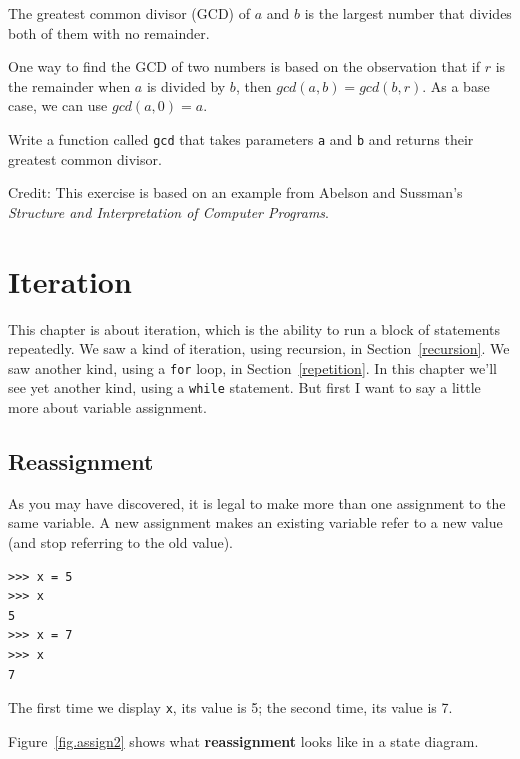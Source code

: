 \documentclass[10pt]{book}
\begin{document}
\begin{exercise}

The greatest common divisor (GCD) of $a$ and $b$ is the largest number
that divides both of them with no remainder.

One way to find the GCD of two numbers is based on the observation
that if $r$ is the remainder when $a$ is divided by $b$, then $gcd(a,
b) = gcd(b, r)$.  As a base case, we can use $gcd(a, 0) = a$.

Write a function called
\verb"gcd" that takes parameters {\tt a} and {\tt b}
and returns their greatest common divisor.

Credit: This exercise is based on an example from Abelson and
Sussman's {\em Structure and Interpretation of Computer Programs}.

\end{exercise}


\chapter{Iteration}

This chapter is about iteration, which is the ability to run
a block of statements repeatedly.  We saw a kind of iteration,
using recursion, in Section~\ref{recursion}.
We saw another kind, using a {\tt for} loop,
in Section~\ref{repetition}.  In this chapter we'll see yet another
kind, using a {\tt while} statement.
But first I want to say a little more about variable assignment.


\section{Reassignment}

As you may have discovered, it is legal to make more than one
assignment to the same variable.  A new assignment makes an existing
variable refer to a new value (and stop referring to the old value).

\begin{verbatim}
>>> x = 5
>>> x
5
>>> x = 7
>>> x
7
\end{verbatim}
%
The first time we display
{\tt x}, its value is 5; the second time, its
value is 7.

Figure~\ref{fig.assign2} shows what {\bf reassignment} looks
like in a state diagram.  
\end{document}
